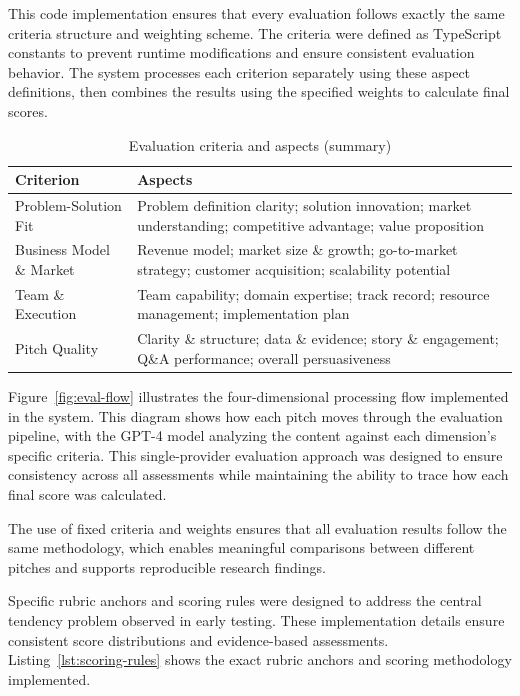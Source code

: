 This code implementation ensures that every evaluation follows exactly the same criteria structure and weighting scheme. The criteria were defined as TypeScript constants to prevent runtime modifications and ensure consistent evaluation behavior. The system processes each criterion separately using these aspect definitions, then combines the results using the specified weights to calculate final scores.

\begin{table}[H]
  \centering
  \caption{Evaluation criteria and aspects (summary)}
  \label{tab:criteria}
  \begin{tabular}{p{4cm} p{9cm}}
    \toprule
    \textbf{Criterion} & \textbf{Aspects} \\
    \midrule
    Problem\mbox{-}Solution Fit & Problem definition clarity; solution innovation; market understanding; competitive advantage; value proposition \\
    Business Model \& Market & Revenue model; market size \& growth; go-to-market strategy; customer acquisition; scalability potential \\
    Team \& Execution & Team capability; domain expertise; track record; resource management; implementation plan \\
    Pitch Quality & Clarity \& structure; data \& evidence; story \& engagement; Q\&A performance; overall persuasiveness \\
    \bottomrule
  \end{tabular}
\end{table}

Figure~\ref{fig:eval-flow} illustrates the four-dimensional processing flow implemented in the system. This diagram shows how each pitch moves through the evaluation pipeline, with the GPT-4 model analyzing the content against each dimension's specific criteria. This single-provider evaluation approach was designed to ensure consistency across all assessments while maintaining the ability to trace how each final score was calculated.

The use of fixed criteria and weights ensures that all evaluation results follow the same methodology, which enables meaningful comparisons between different pitches and supports reproducible research findings.

Specific rubric anchors and scoring rules were designed to address the central tendency problem observed in early testing. These implementation details ensure consistent score distributions and evidence-based assessments. Listing~\ref{lst:scoring-rules} shows the exact rubric anchors and scoring methodology implemented.

